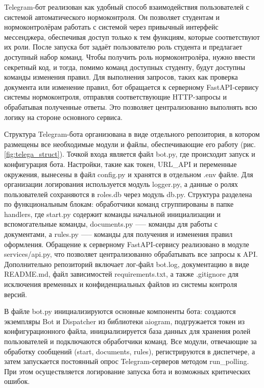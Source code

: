 \documentclass{report}
\begin{document}

Telegram-бот реализован как удобный способ взаимодействия пользователей с системой автоматического нормоконтроля. Он позволяет студентам и нормоконтролёрам работать с системой через привычный интерфейс мессенджера, обеспечивая доступ только к тем функциям, которые соответствуют их роли. После запуска бот задаёт пользователю роль студента и предлагает доступный набор команд. Чтобы получить роль нормоконтролёра, нужно ввести секретный код, и тогда, помимо команд доступных студенту, будут доступны команды изменения правил. Для выполнения запросов, таких как проверка документа или изменение правил, бот обращается к серверному FastAPI-сервису системы нормоконтроля, отправляя соответствующие HTTP-запросы и обрабатывая полученные ответы. Это позволяет централизованно выполнять всю логику на стороне основного сервиса.


Структура Telegram-бота организована в виде отдельного репозитория, в котором размещены все необходимые модули и файлы, обеспечивающие его работу (рис. \ref{fig:telega_struct}). Точкой входа является файл bot.py, где происходит запуск и конфигурация бота. Настройки, такие как токен, URL\_API и переменные окружения, вынесены в файл config.py и хранятся в отдельном .env файле. Для организации логирования используется модуль logger.py, а данные о ролях пользователей сохраняются в roles.db через модуль db.py. Структура разделена по функциональным блокам: обработчики команд сгруппированы в папке handlers, где start.py содержит команды начальной инициализации и вспомогательные команды, documents.py —-- команды для работы с документами, а rules.py —-- команды для получения и изменения правил оформления. Обращение к серверному FastAPI-сервису реализовано в модуле services/api.py, что позволяет централизованно обрабатывать все запросы к API. Дополнительно репозиторий включает лог-файл bot.log, документацию в виде README.md, файл зависимостей requirements.txt, а также .gitignore для исключения временных и конфиденциальных файлов из системы контроля версий.


В файле bot.py инициализируются основные компоненты бота: создаются экземпляры Bot и Dispatcher из библиотеки aiogram, подгружается токен из конфигурационного файла, инициализируется база данных для хранения ролей пользователей и подключаются обработчики команд. Все модули, отвечающие за обработку сообщений (start, documents, rules), регистрируются в диспетчере, а затем запускается постоянный опрос Telegram-серверов методом run\_polling. При этом осуществляется логирование запуска бота и возможных критических ошибок.
\end{document}
